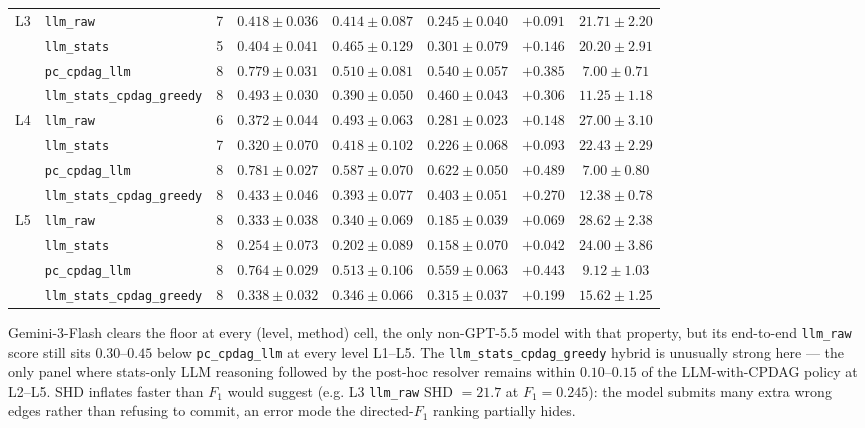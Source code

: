 \begin{center}
\begin{tabular}{@{}l l c c c c c c@{}}
\midrule
L3 & \texttt{llm\_raw}                & 7 & $0.418 \pm 0.036$ & $0.414 \pm 0.087$ & $0.245 \pm 0.040$ & $+0.091$ & $21.71 \pm 2.20$ \\
   & \texttt{llm\_stats}              & 5 & $0.404 \pm 0.041$ & $0.465 \pm 0.129$ & $0.301 \pm 0.079$ & $+0.146$ & $20.20 \pm 2.91$ \\
   & \texttt{pc\_cpdag\_llm}          & 8 & $0.779 \pm 0.031$ & $0.510 \pm 0.081$ & $0.540 \pm 0.057$ & $+0.385$ & $7.00 \pm 0.71$ \\
   & \texttt{llm\_stats\_cpdag\_greedy} & 8 & $0.493 \pm 0.030$ & $0.390 \pm 0.050$ & $0.460 \pm 0.043$ & $+0.306$ & $11.25 \pm 1.18$ \\
\midrule
L4 & \texttt{llm\_raw}                & 6 & $0.372 \pm 0.044$ & $0.493 \pm 0.063$ & $0.281 \pm 0.023$ & $+0.148$ & $27.00 \pm 3.10$ \\
   & \texttt{llm\_stats}              & 7 & $0.320 \pm 0.070$ & $0.418 \pm 0.102$ & $0.226 \pm 0.068$ & $+0.093$ & $22.43 \pm 2.29$ \\
   & \texttt{pc\_cpdag\_llm}          & 8 & $0.781 \pm 0.027$ & $0.587 \pm 0.070$ & $0.622 \pm 0.050$ & $+0.489$ & $7.00 \pm 0.80$ \\
   & \texttt{llm\_stats\_cpdag\_greedy} & 8 & $0.433 \pm 0.046$ & $0.393 \pm 0.077$ & $0.403 \pm 0.051$ & $+0.270$ & $12.38 \pm 0.78$ \\
\midrule
L5 & \texttt{llm\_raw}                & 8 & $0.333 \pm 0.038$ & $0.340 \pm 0.069$ & $0.185 \pm 0.039$ & $+0.069$ & $28.62 \pm 2.38$ \\
   & \texttt{llm\_stats}              & 8 & $0.254 \pm 0.073$ & $0.202 \pm 0.089$ & $0.158 \pm 0.070$ & $+0.042$ & $24.00 \pm 3.86$ \\
   & \texttt{pc\_cpdag\_llm}          & 8 & $0.764 \pm 0.029$ & $0.513 \pm 0.106$ & $0.559 \pm 0.063$ & $+0.443$ & $9.12 \pm 1.03$ \\
   & \texttt{llm\_stats\_cpdag\_greedy} & 8 & $0.338 \pm 0.032$ & $0.346 \pm 0.066$ & $0.315 \pm 0.037$ & $+0.199$ & $15.62 \pm 1.25$ \\
\bottomrule
\end{tabular}
\end{center}

Gemini-3-Flash clears the floor at every (level, method) cell, the only non-GPT-5.5 model with that property, but its end-to-end \texttt{llm\_raw} score still sits $0.30$--$0.45$ below \texttt{pc\_cpdag\_llm} at every level L1--L5. The \texttt{llm\_stats\_cpdag\_greedy} hybrid is unusually strong here --- the only panel where stats-only LLM reasoning followed by the post-hoc resolver remains within $0.10$--$0.15$ of the LLM-with-CPDAG policy at L2--L5. SHD inflates faster than $F_1$ would suggest (e.g. L3 \texttt{llm\_raw} SHD $=21.7$ at $F_1 = 0.245$): the model submits many extra wrong edges rather than refusing to commit, an error mode the directed-$F_1$ ranking partially hides.

